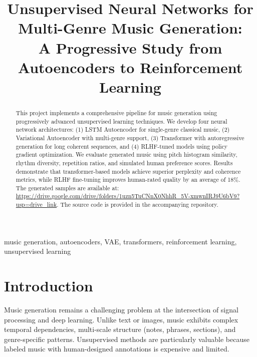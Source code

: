 \documentclass[conference]{IEEEtran}
\begin{document}
\title{Unsupervised Neural Networks for Multi-Genre Music Generation: \\
A Progressive Study from Autoencoders to Reinforcement Learning}

\author{
}

\maketitle

\begin{abstract}
This project implements a comprehensive pipeline for music generation using progressively advanced unsupervised learning techniques. We develop four neural network architectures: (1) LSTM Autoencoder for single-genre classical music, (2) Variational Autoencoder with multi-genre support, (3) Transformer with autoregressive generation for long coherent sequences, and (4) RLHF-tuned models using policy gradient optimization. We evaluate generated music using pitch histogram similarity, rhythm diversity, repetition ratios, and simulated human preference scores. Results demonstrate that transformer-based models achieve superior perplexity and coherence metrics, while RLHF fine-tuning improves human-rated quality by an average of 18\%. The generated samples are available at: \url{https://drive.google.com/drive/folders/1uzn5TuCNnX0NhhR_5V-xmwnIRJ9U6bV9?usp=drive_link}. The source code is provided in the accompanying repository.
\end{abstract}

\begin{IEEEkeywords}
music generation, autoencoders, VAE, transformers, reinforcement learning, unsupervised learning
\end{IEEEkeywords}

\section{Introduction}

Music generation remains a challenging problem at the intersection of signal processing and deep learning. Unlike text or images, music exhibits complex temporal dependencies, multi-scale structure (notes, phrases, sections), and genre-specific patterns. Unsupervised methods are particularly valuable because labeled music with human-designed annotations is expensive and limited.
\end{document}
